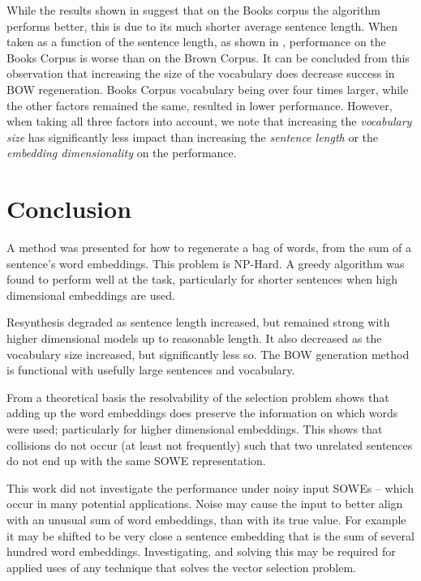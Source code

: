 \documentclass{llncs}
\begin{document}
While the results shown in  suggest that on the Books corpus the algorithm performs better, this is due to its much shorter average sentence length. When taken as a function of the sentence length, as shown in ,  performance on the Books Corpus is worse than on the Brown Corpus. It can be concluded from this observation that increasing the size of the vocabulary does decrease success in BOW regeneration. Books Corpus vocabulary being over four times larger, while the other factors remained the same, resulted in lower performance. However, when taking all three factors into account, we note that increasing the \emph{vocabulary size} has significantly less impact than increasing the \emph{sentence length} or the \emph{embedding dimensionality} on the performance.


\section{Conclusion} \label{conclusion}
A method was presented for how to regenerate a bag of words, from the sum of a sentence's word embeddings. This problem is NP-Hard. A greedy algorithm was found to perform well at the task, particularly for shorter sentences when high dimensional embeddings are used. 

Resynthesis degraded as sentence length increased, but remained strong with higher dimensional models up to reasonable length. It also decreased as the vocabulary size increased, but significantly less so. The BOW generation method is functional with usefully large sentences and vocabulary.

From a theoretical basis the resolvability of the selection problem shows that adding up the word embeddings does preserve the information on which words were used; particularly for higher dimensional embeddings. This shows  that collisions do not occur (at least not frequently) such that two unrelated sentences do not end up with the same SOWE representation. 

This work did not investigate the performance under noisy input SOWEs -- which occur in many potential applications. Noise may cause the input to better align with an unusual sum of word embeddings, than with its true value. For example it may be shifted to be very close a sentence embedding that is the sum of several hundred word embeddings. Investigating, and solving this may be required for applied uses of any technique that solves the vector selection problem.
\end{document}
